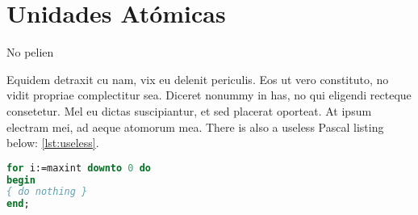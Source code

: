 \section{Unidades Atómicas}
\faHandshake[regular] No pelien

Equidem detraxit cu nam, vix eu delenit periculis. Eos ut vero
constituto, no vidit propriae complectitur sea. Diceret nonummy in
has, no qui eligendi recteque consetetur. Mel eu dictas suscipiantur,
et sed placerat oporteat. At ipsum electram mei, ad aeque atomorum
mea. There is also a useless Pascal listing below: \autoref{lst:useless}.

\begin{lstlisting}[float=b,language=Pascal,frame=tb,caption={A floating example (\texttt{listings} manual)},label=lst:useless]
for i:=maxint downto 0 do
begin
{ do nothing }
end;
\end{lstlisting}


